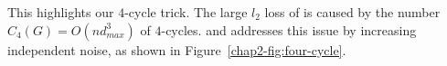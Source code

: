 This highlights our $4$-cycle trick.
The large $l_2$ loss of \AlgOne{} is caused by the number $C_4(G) = O(n d_{max}^3)$ of $4$-cycles.
\AlgTwo{} and \AlgThree{} addresses this issue by increasing independent noise, as shown in Figure~\ref{chap2-fig:four-cycle}.



